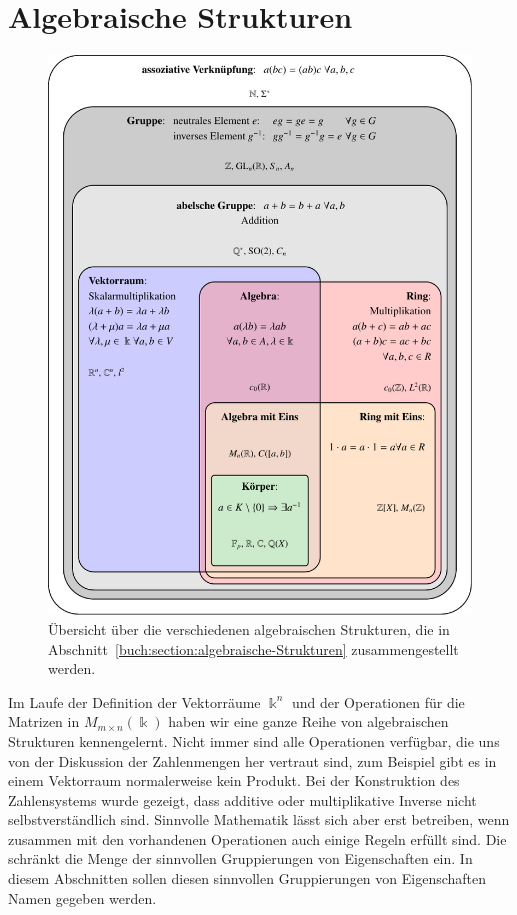 %
%
%
\section{Algebraische Strukturen
\label{buch:section:algebraische-Strukturen}}
\begin{figure}
\centering
\includegraphics[width=\textwidth]{chapters/10-vektorenmatrizen/images/strukturen.pdf}
\caption{Übersicht über die verschiedenen algebraischen Strukturen, die
in Abschnitt~\ref{buch:section:algebraische-Strukturen} zusammengestellt
werden.
\label{buch:vektorenmatrizen:fig:strukturen}}
\end{figure}
Im Laufe der Definition der Vektorräume $\Bbbk^n$ und der
Operationen für die Matrizen in $M_{m\times n}(\Bbbk)$ haben
wir eine ganze Reihe von algebraischen Strukturen kennengelernt.
Nicht immer sind alle Operationen verfügbar, die uns von der Diskussion
der Zahlenmengen her vertraut sind, zum Beispiel gibt es in einem
Vektorraum normalerweise kein Produkt.
Bei der Konstruktion des Zahlensystems wurde gezeigt, dass
additive oder multiplikative Inverse nicht selbstverständlich
sind.
Sinnvolle Mathematik lässt sich aber erst betreiben, wenn zusammen
mit den vorhandenen Operationen auch einige Regeln erfüllt sind.
Die schränkt die Menge der sinnvollen Gruppierungen von Eigenschaften
ein.
In diesem Abschnitten sollen diesen sinnvollen Gruppierungen von
Eigenschaften Namen gegeben werden.








